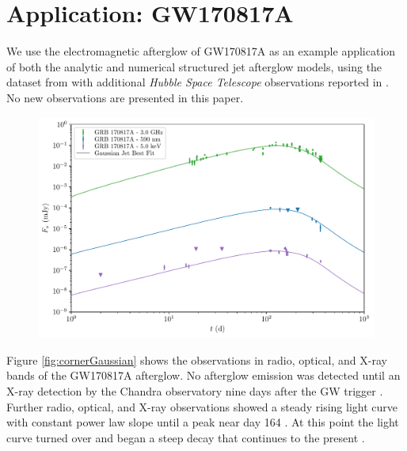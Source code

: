 \documentclass[twocolumn]{aastex62}
\newcommand{\gwbns}{GW170817A}
\newcommand{\hubble}{{\em Hubble Space Telescope}}
\begin{document}
%
%

\section{Application: \gwbns{}}\label{sec:gw170817}

We use the electromagnetic afterglow of \gwbns{} as an example application of both the analytic and numerical structured jet afterglow models, using the dataset from \citet{Troja:2019ab} with additional \hubble{} observations reported in \citet{Lamb:2019aa}. No new observations are presented in this paper.

\begin{figure}
	\includegraphics[width=\textwidth]{figs/lc_170817A_Gaussian_map.pdf}
	\caption{\label{fig:lc170817A}}
\end{figure}

Figure \ref{fig:cornerGaussian} shows the observations in radio, optical, and X-ray bands of the \gwbns{} afterglow.  No afterglow emission was detected until an X-ray detection by the Chandra observatory nine days after the GW trigger \cite{Troja:2017aa}.  Further radio, optical, and X-ray observations showed a steady rising light curve with constant power law slope until a peak near day 164 \citep{Haggard:2017aa, Hallinan:2017aa, DAvanzo:2018aa,  Lyman:2018aa, Margutti:2018aa, Mooley:2018aa, Troja:2018aa, Troja:2019ab}.  At this point the light curve turned over and began a steep decay that continues to the present \citep{Alexander:2018aa, Fong:2019aa, Lamb:2019aa, Troja:2019ab}.
\end{document}
